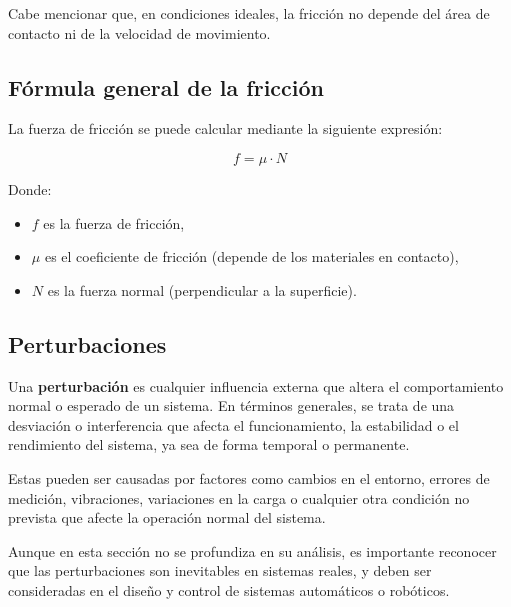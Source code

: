 Cabe mencionar que, en condiciones ideales, la fricción no depende del área de contacto ni de la velocidad de movimiento.

\subsection{Fórmula general de la fricción}
La fuerza de fricción se puede calcular mediante la siguiente expresión:

\begin{equation}
	f = \mu \cdot N
\end{equation}

Donde:
\begin{itemize}
	\item $f$ es la fuerza de fricción,
	\item $\mu$ es el coeficiente de fricción (depende de los materiales en contacto),
	\item $N$ es la fuerza normal (perpendicular a la superficie).
\end{itemize}

\subsection{Perturbaciones}

Una \textbf{perturbación} es cualquier influencia externa que altera el comportamiento normal o esperado de un sistema. En términos generales, se trata de una desviación o interferencia que afecta el funcionamiento, la estabilidad o el rendimiento del sistema, ya sea de forma temporal o permanente.

Estas pueden ser causadas por factores como cambios en el entorno, errores de medición, vibraciones, variaciones en la carga o cualquier otra condición no prevista que afecte la operación normal del sistema.

Aunque en esta sección no se profundiza en su análisis, es importante reconocer que las perturbaciones son inevitables en sistemas reales, y deben ser consideradas en el diseño y control de sistemas automáticos o robóticos.
